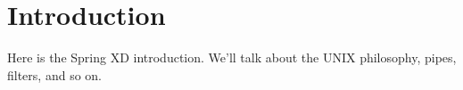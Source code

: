 \section{Introduction}
Here is the Spring XD introduction. We'll talk about the UNIX philosophy, pipes, filters, and so on.